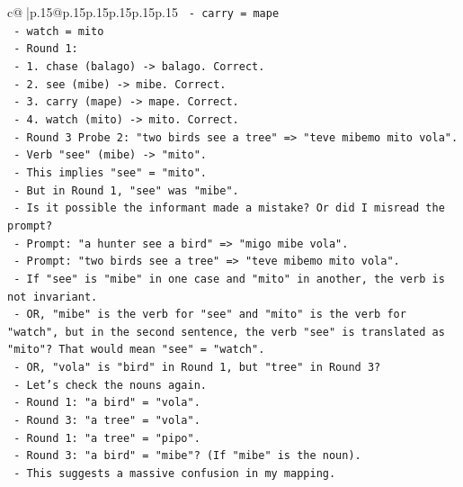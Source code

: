 \documentclass{article}
\begin{document}
{\begin{supertabular}{c@{$\;$}|p{.15\linewidth}@{}p{.15\linewidth}p{.15\linewidth}p{.15\linewidth}p{.15\linewidth}p{.15\linewidth}}
{{{\texttt{              {-} carry = mape} \\
\texttt{              {-} watch = mito} \\
\texttt{            {-} Round 1:} \\
\texttt{              {-} 1. chase (balago) {-}> balago. Correct.} \\
\texttt{              {-} 2. see (mibe) {-}> mibe. Correct.} \\
\texttt{              {-} 3. carry (mape) {-}> mape. Correct.} \\
\texttt{              {-} 4. watch (mito) {-}> mito. Correct.} \\
\texttt{            {-} Round 3 Probe 2: "two birds see a tree" => "teve mibemo mito vola".} \\
\texttt{              {-} Verb "see" (mibe) {-}> "mito".} \\
\texttt{              {-} This implies "see" = "mito".} \\
\texttt{              {-} But in Round 1, "see" was "mibe".} \\
\texttt{              {-} Is it possible the informant made a mistake? Or did I misread the prompt?} \\
\texttt{              {-} Prompt: "a hunter see a bird" => "migo mibe vola".} \\
\texttt{              {-} Prompt: "two birds see a tree" => "teve mibemo mito vola".} \\
\texttt{              {-} If "see" is "mibe" in one case and "mito" in another, the verb is not invariant.} \\
\texttt{              {-} OR, "mibe" is the verb for "see" and "mito" is the verb for "watch", but in the second sentence, the verb "see" is translated as "mito"? That would mean "see" = "watch".} \\
\texttt{              {-} OR, "vola" is "bird" in Round 1, but "tree" in Round 3?} \\
\texttt{              {-} Let's check the nouns again.} \\
\texttt{                {-} Round 1: "a bird" = "vola".} \\
\texttt{                {-} Round 3: "a tree" = "vola".} \\
\texttt{                {-} Round 1: "a tree" = "pipo".} \\
\texttt{                {-} Round 3: "a bird" = "mibe"? (If "mibe" is the noun).} \\
\texttt{              {-} This suggests a massive confusion in my mapping.} \\
}}}
\end{supertabular}}
\end{document}
